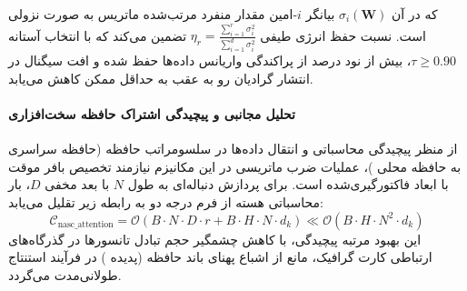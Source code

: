 
که در آن $\sigma_i(\mathbf{W})$ بیانگر $i$-امین مقدار منفرد مرتب‌شده ماتریس به صورت نزولی است. نسبت حفظ انرژی طیفی $\eta_r = \frac{\sum_{i=1}^r \sigma_i^2}{\sum_{i=1}^{d} \sigma_i^2}$ تضمین می‌کند که با انتخاب آستانه $\tau \ge 0.90$، بیش از نود درصد از پراکندگی واریانس داده‌ها حفظ شده و افت سیگنال در انتشار گرادیان رو به عقب به حداقل ممکن کاهش می‌یابد.

\paragraph{تحلیل مجانبی و پیچیدگی اشتراک حافظه سخت‌افزاری}
از منظر پیچیدگی محاسباتی و انتقال داده‌ها در سلسومراتب حافظه (حافظه سراسری  به حافظه محلی )، عملیات ضرب ماتریسی در این مکانیزم نیازمند تخصیص بافر موقت با ابعاد فاکتورگیری‌شده است. برای پردازش دنباله‌ای به طول $N$ با بعد مخفی $D$، بار محاسباتی هسته از فرم درجه دو به رابطه زیر تقلیل می‌یابد:
\begin{equation}
\label{eq:complexity_nasc_attention}
\mathcal{C}_{\text{nasc\_attention}} = \mathcal{O}\left( B \cdot N \cdot D \cdot r + B \cdot H \cdot N \cdot d_k \right) \ll \mathcal{O}\left( B \cdot H \cdot N^2 \cdot d_k \right)
\end{equation}
این بهبود مرتبه پیچیدگی، با کاهش چشمگیر حجم تبادل تانسورها در گذرگاه‌های ارتباطی کارت گرافیک، مانع از اشباع پهنای باند حافظه (پدیده ) در فرآیند استنتاج طولانی‌مدت می‌گردد.